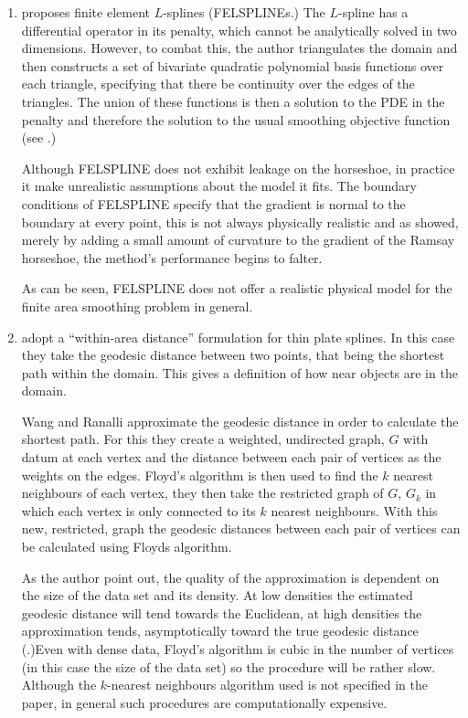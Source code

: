 \begin{enumerate}
\item \cite{ramsay} proposes finite element $L$-splines (FELSPLINEs.) The $L$-spline has a differential operator in its penalty, which cannot be analytically solved in two dimensions. However, to combat this, the author triangulates the domain and then constructs a set of bivariate quadratic polynomial basis functions over each triangle, specifying that there be continuity over the edges of the triangles. The union of these functions is then a solution to the PDE in the penalty and therefore the solution to the usual smoothing objective function (see .)

Although FELSPLINE does not exhibit leakage on the horseshoe, in practice it make unrealistic assumptions about the model it fits. The boundary conditions of FELSPLINE specify that the gradient is normal to the boundary at every point, this is not always physically realistic and as \cite{soap} showed, merely by adding a small amount of curvature to the gradient of the Ramsay horseshoe, the method's performance begins to falter.

As can be seen, FELSPLINE does not offer a realistic physical model for the finite area smoothing problem in general.

\item \cite{wangranalli} adopt a ``within-area distance'' formulation for thin plate splines. In this case they take the geodesic distance between two points, that being the shortest path within the domain. This gives a definition of how near objects are in the domain.

Wang and Ranalli approximate the geodesic distance in order to calculate the shortest path. For this they create a weighted, undirected graph, $G$ with datum at each vertex and the distance between each pair of vertices as the weights on the edges. Floyd's algorithm is then used to find the $k$ nearest neighbours of each vertex, they then take the restricted graph of $G$, $G_k$ in which each vertex is only connected to its $k$ nearest neighbours. With this new, restricted, graph the geodesic distances between each pair of vertices can be calculated using Floyds algorithm.

As the author point out, the quality of the approximation is dependent on the size of the data set and its density. At low densities the estimated geodesic distance will tend towards the Euclidean, at high densities the approximation tends, asymptotically toward the true geodesic distance (\cite{bernstein}.)Even with dense data, Floyd's algorithm is cubic in the number of vertices (in this case the size of the data set) so the procedure will be rather slow. Although the $k$-nearest neighbours algorithm used is not specified in the paper, in general such procedures are computationally expensive.


\end{enumerate}
